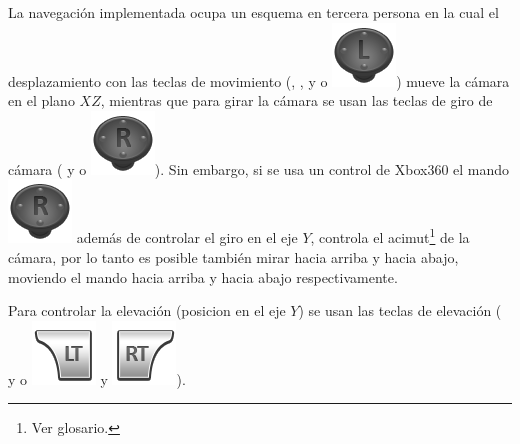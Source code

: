 La navegación implementada ocupa un esquema en tercera persona en la cual el desplazamiento con las teclas de movimiento (, ,  y  o \includegraphics[scale=0.4, trim= 0 20 0 0]{images/visualizer/xbox360/leftStick.png}) mueve la cámara en el plano $XZ$, mientras que para girar la cámara se usan las teclas de giro de cámara (\keystroke{$\leftarrow$} y \keystroke{$\rightarrow$} o \includegraphics[scale=0.4, trim= 0 20 0 0]{images/visualizer/xbox360/rightStick.png}). Sin embargo, si se usa un control de Xbox360\textsuperscript{\textregistered} el mando \includegraphics[scale=0.4, trim= 0 20 0 0]{images/visualizer/xbox360/rightStick.png} además de controlar el giro en el eje $Y$, controla el acimut\footnote{Ver glosario.} de la cámara, por lo tanto es posible también mirar hacia arriba y hacia abajo, moviendo el mando hacia arriba y hacia abajo respectivamente.

Para controlar la elevación (posicion en el eje $Y$) se usan las teclas de elevación (\keystroke{$\uparrow$} y \keystroke{$\downarrow$} o \includegraphics[scale=0.4, trim= 0 20 0 0]{images/visualizer/xbox360/leftShoulder1.png} y \includegraphics[scale=0.4, trim= 0 20 0 0]{images/visualizer/xbox360/rightShoulder1.png}).

